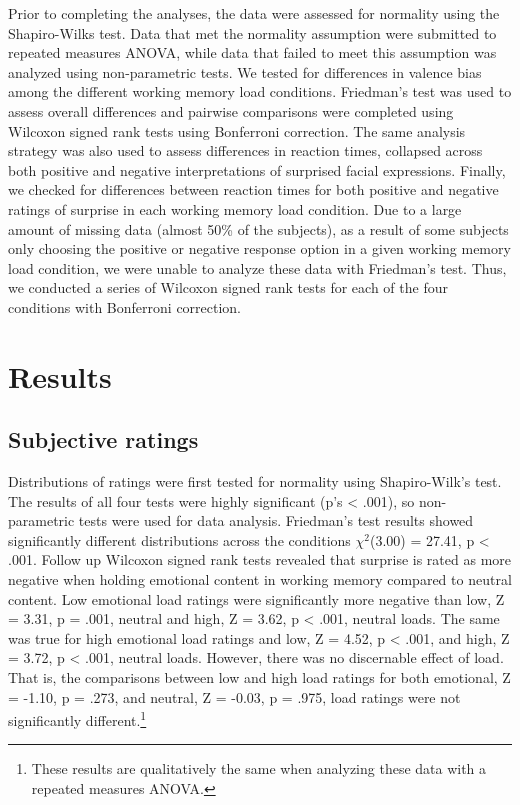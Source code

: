 \documentclass[man]{apa6}
\let\rmarkdownfootnote\footnote%
\def\footnote{\protect\rmarkdownfootnote}
\begin{document}
Prior to completing the analyses, the data were assessed for normality using the Shapiro-Wilks test. Data that met the normality assumption were submitted to repeated measures ANOVA, while data that failed to meet this assumption was analyzed using non-parametric tests. We tested for differences in valence bias among the different working memory load conditions. Friedman's test was used to assess overall differences and pairwise comparisons were completed using Wilcoxon signed rank tests using Bonferroni correction. The same analysis strategy was also used to assess differences in reaction times, collapsed across both positive and negative interpretations of surprised facial expressions. Finally, we checked for differences between reaction times for both positive and negative ratings of surprise in each working memory load condition. Due to a large amount of missing data (almost 50\% of the subjects), as a result of some subjects only choosing the positive or negative response option in a given working memory load condition, we were unable to analyze these data with Friedman's test. Thus, we conducted a series of Wilcoxon signed rank tests for each of the four conditions with Bonferroni correction.

\hypertarget{results}{%
\section{Results}\label{results}}

\hypertarget{subjective-ratings}{%
\subsection{Subjective ratings}\label{subjective-ratings}}

Distributions of ratings were first tested for normality using Shapiro-Wilk's test. The results of all four tests were highly significant (p's \textless{} .001), so non-parametric tests were used for data analysis. Friedman's test results showed significantly different distributions across the conditions \(\chi^{2}\)(3.00) = 27.41, p \textless{} .001. Follow up Wilcoxon signed rank tests revealed that surprise is rated as more negative when holding emotional content in working memory compared to neutral content. Low emotional load ratings were significantly more negative than low, Z = 3.31, p = .001, neutral and high, Z = 3.62, p \textless{} .001, neutral loads. The same was true for high emotional load ratings and low, Z = 4.52, p \textless{} .001, and high, Z = 3.72, p \textless{} .001, neutral loads. However, there was no discernable effect of load. That is, the comparisons between low and high load ratings for both emotional, Z = -1.10, p = .273, and neutral, Z = -0.03, p = .975, load ratings were not significantly different.\footnote{These results are qualitatively the same when analyzing these data with a repeated measures ANOVA.}
\end{document}
